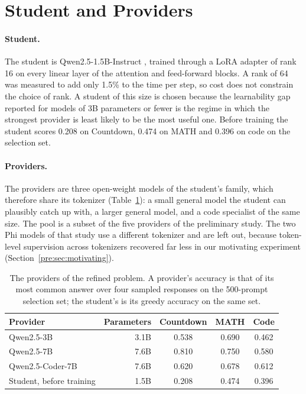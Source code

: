 \section{Student and Providers}
\label{imp:sec:providers}

\paragraph{Student.} The student is Qwen2.5-1.5B-Instruct \autocite{qwen_qwen25_2024},
trained through a LoRA adapter \autocite{hu_lora_2022} of rank 16 on every linear layer
of the attention and feed-forward blocks. A rank of 64 was measured to add only 1.5\%
to the time per step, so cost does not constrain the choice of rank. A student of this
size is chosen because the learnability gap reported for models of 3B parameters or
fewer \autocite{li_learnability_gap_2025} is the regime in which the strongest provider
is least likely to be the most useful one. Before training the student scores 0.208 on
Countdown, 0.474 on MATH and 0.396 on code on the selection set.

\paragraph{Providers.} The providers are three open-weight models of the student's
family, which therefore share its tokenizer (Table~\ref{imp:tab:pool}): a small general
model the student can plausibly catch up with, a larger general model, and a code
specialist of the same size. The pool is a subset of the five providers of the
preliminary study. The two Phi models of that study use a different tokenizer and are
left out, because token-level supervision across tokenizers recovered far less in our
motivating experiment (Section~\ref{pre:sec:motivating}).

\begin{table}[htbp]
\centering
\small
\begin{tabular}{@{}lrccc@{}}
\toprule
\textbf{Provider} & \textbf{Parameters} & \textbf{Countdown} & \textbf{MATH} & \textbf{Code} \\
\midrule
Qwen2.5-3B \autocite{qwen_qwen25_2024}           & 3.1B & 0.538 & 0.690 & 0.462 \\
Qwen2.5-7B \autocite{qwen_qwen25_2024}           & 7.6B & 0.810 & 0.750 & 0.580 \\
Qwen2.5-Coder-7B \autocite{hui_qwen25coder_2024} & 7.6B & 0.620 & 0.678 & 0.612 \\
\midrule
Student, before training                         & 1.5B & 0.208 & 0.474 & 0.396 \\
\bottomrule
\end{tabular}
\caption{The providers of the refined problem. A provider's accuracy is that of its most
common answer over four sampled responses on the 500-prompt selection set; the student's
is its greedy accuracy on the same set.}
\label{imp:tab:pool}
\end{table}

